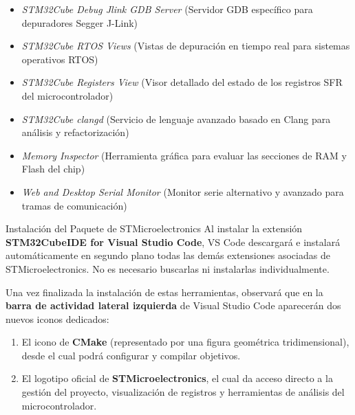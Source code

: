 \documentclass[
10pt, %
a4paper, %
oneside, %
headinclude,footinclude, %
BCOR5mm, %
]{scrartcl}
\begin{document}
\begin{itemize}
\begin{itemize}
		\item \textit{STM32Cube Debug Jlink GDB Server} (Servidor GDB específico para depuradores Segger J-Link)
		\item \textit{STM32Cube RTOS Views} (Vistas de depuración en tiempo real para sistemas operativos RTOS)
		\item \textit{STM32Cube Registers View} (Visor detallado del estado de los registros SFR del microcontrolador)
		\item \textit{STM32Cube clangd} (Servicio de lenguaje avanzado basado en Clang para análisis y refactorización)
		\item \textit{Memory Inspector} (Herramienta gráfica para evaluar las secciones de RAM y Flash del chip)
		\item \textit{Web and Desktop Serial Monitor} (Monitor serie alternativo y avanzado para tramas de comunicación)
	\end{itemize}
\end{itemize}
\begin{InfoBox}{Instalación del Paquete de STMicroelectronics}
	Al instalar la extensión \textbf{STM32CubeIDE for Visual Studio Code}, VS Code descargará e instalará automáticamente en segundo plano todas las demás extensiones asociadas de STMicroelectronics. No es necesario buscarlas ni instalarlas individualmente.
\end{InfoBox}

Una vez finalizada la instalación de estas herramientas, observará que en la \textbf{barra de actividad lateral izquierda} de Visual Studio Code aparecerán dos nuevos iconos dedicados:
\begin{enumerate}
	\item El icono de \textbf{CMake} (representado por una figura geométrica tridimensional), desde el cual podrá configurar y compilar objetivos.
	\item El logotipo oficial de \textbf{STMicroelectronics}, el cual da acceso directo a la gestión del proyecto, visualización de registros y herramientas de análisis del microcontrolador.
\end{enumerate}

\end{document}
